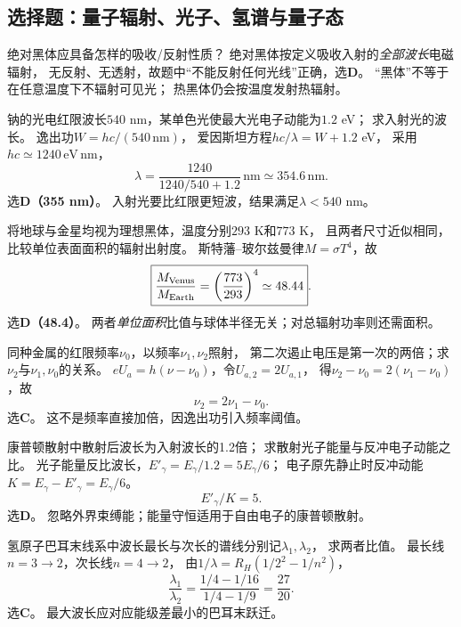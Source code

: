 \subsection{选择题：量子辐射、光子、氢谱与量子态}

\problemtext 绝对黑体应具备怎样的吸收/反射性质？
\workings
绝对黑体按定义吸收入射的\emph{全部波长}电磁辐射，
无反射、无透射，故题中“不能反射任何光线”正确，选\textbf{D}。
\crosscheck “黑体”不等于在任意温度下不辐射可见光；
热黑体仍会按温度发射热辐射。

\problemtext 钠的光电红限波长$540$ nm，某单色光使最大光电子动能为$1.2$ eV；
求入射光的波长。
\workings
逸出功$W=hc/(540\,\mathrm{nm})$，
爱因斯坦方程$hc/\lambda=W+1.2$ eV，
采用$hc\simeq1240\,\mathrm{eV\,nm}$，
\[
\boxed{\lambda=\frac{1240}{1240/540+1.2}\,\mathrm{nm}
\simeq354.6\,\mathrm{nm}}.
\]
选\textbf{D（355 nm）}。
\crosscheck 入射光要比红限更短波，结果满足$\lambda<540$ nm。

\problemtext 将地球与金星均视为理想黑体，温度分别$293$ K和$773$ K，
且两者尺寸近似相同，比较单位表面面积的辐射出射度。
\workings
斯特藩--玻尔兹曼律$M=\sigma T^4$，故
\[
\boxed{\frac{M_{\rm Venus}}{M_{\rm Earth}}
=\left(\frac{773}{293}\right)^4\simeq48.44}.
\]
选\textbf{D（48.4）}。
\crosscheck 两者\emph{单位面积}比值与球体半径无关；对总辐射功率则还需面积。

\problemtext 同种金属的红限频率$\nu_0$，以频率$\nu_1,\nu_2$照射，
第二次遏止电压是第一次的两倍；求$\nu_2$与$\nu_1,\nu_0$的关系。
\workings
$eU_a=h(\nu-\nu_0)$，令$U_{a,2}=2U_{a,1}$，
得$\nu_2-\nu_0=2(\nu_1-\nu_0)$，故
\[
\boxed{\nu_2=2\nu_1-\nu_0}.
\]
选\textbf{C}。
\crosscheck 这不是频率直接加倍，因逸出功引入频率阈值。

\problemtext 康普顿散射中散射后波长为入射波长的1.2倍；
求散射光子能量与反冲电子动能之比。
\workings
光子能量反比波长，$E'_{\gamma}=E_\gamma/1.2=5E_\gamma/6$；
电子原先静止时反冲动能$K=E_\gamma-E'_\gamma=E_\gamma/6$。
\[
\boxed{E'_\gamma/K=5}.
\]
选\textbf{D}。
\crosscheck 忽略外界束缚能；能量守恒适用于自由电子的康普顿散射。

\problemtext 氢原子巴耳末线系中波长最长与次长的谱线分别记$\lambda_1,\lambda_2$，
求两者比值。
\workings
最长线$n=3\to2$，次长线$n=4\to2$，
由$1/\lambda=R_H(1/2^2-1/n^2)$，
\[
\boxed{\frac{\lambda_1}{\lambda_2}
=\frac{1/4-1/16}{1/4-1/9}=\frac{27}{20}}.
\]
选\textbf{C}。
\crosscheck 最大波长应对应能级差最小的巴耳末跃迁。

